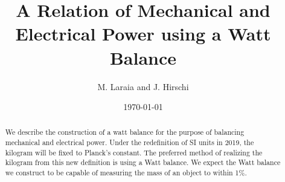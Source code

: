 \documentclass[aps,prstab,reprint,12pt]{revtex4-1}
\begin{document}
\title{A Relation of Mechanical and Electrical Power using a Watt Balance}

\author{M. Laraia and J. Hirschi}


\date{\today}

\begin{abstract}
    
    We describe the construction of a watt balance for the purpose of balancing mechanical and electrical power. Under the redefinition of SI units in 2019, the kilogram will be fixed to Planck's constant. The preferred method of realizing the kilogram from this new definition is using a Watt balance. We expect the Watt balance we construct to be capable of measuring the mass of an object to within 1\%.


\end{abstract}

\maketitle
\end{document}
